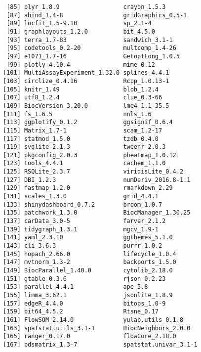 \documentclass[
  letterpaper,
  DIV=11,
  numbers=noendperiod]{scrreprt}
\begin{document}
\begin{verbatim}
 [85] plyr_1.8.9                  crayon_1.5.3               
 [87] abind_1.4-8                 gridGraphics_0.5-1         
 [89] locfit_1.5-9.10             sp_2.1-4                   
 [91] graphlayouts_1.2.0          bit_4.5.0                  
 [93] terra_1.7-83                sandwich_3.1-1             
 [95] codetools_0.2-20            multcomp_1.4-26            
 [97] e1071_1.7-16                GetoptLong_1.0.5           
 [99] plotly_4.10.4               mime_0.12                  
[101] MultiAssayExperiment_1.32.0 splines_4.4.1              
[103] circlize_0.4.16             Rcpp_1.0.13-1              
[105] knitr_1.49                  blob_1.2.4                 
[107] utf8_1.2.4                  clue_0.3-66                
[109] BiocVersion_3.20.0          lme4_1.1-35.5              
[111] fs_1.6.5                    nnls_1.6                   
[113] ggplotify_0.1.2             ggsignif_0.6.4             
[115] Matrix_1.7-1                scam_1.2-17                
[117] statmod_1.5.0               tzdb_0.4.0                 
[119] svglite_2.1.3               tweenr_2.0.3               
[121] pkgconfig_2.0.3             pheatmap_1.0.12            
[123] tools_4.4.1                 cachem_1.1.0               
[125] RSQLite_2.3.7               viridisLite_0.4.2          
[127] DBI_1.2.3                   numDeriv_2016.8-1.1        
[129] fastmap_1.2.0               rmarkdown_2.29             
[131] scales_1.3.0                grid_4.4.1                 
[133] shinydashboard_0.7.2        broom_1.0.7                
[135] patchwork_1.3.0             BiocManager_1.30.25        
[137] carData_3.0-5               farver_2.1.2               
[139] tidygraph_1.3.1             mgcv_1.9-1                 
[141] yaml_2.3.10                 ggthemes_5.1.0             
[143] cli_3.6.3                   purrr_1.0.2                
[145] hopach_2.66.0               lifecycle_1.0.4            
[147] mvtnorm_1.3-2               backports_1.5.0            
[149] BiocParallel_1.40.0         cytolib_2.18.0             
[151] gtable_0.3.6                rjson_0.2.23               
[153] parallel_4.4.1              ape_5.8                    
[155] limma_3.62.1                jsonlite_1.8.9             
[157] edgeR_4.4.0                 bitops_1.0-9               
[159] bit64_4.5.2                 Rtsne_0.17                 
[161] FlowSOM_2.14.0              yulab.utils_0.1.8          
[163] spatstat.utils_3.1-1        BiocNeighbors_2.0.0        
[165] ranger_0.17.0               flowCore_2.18.0            
[167] bdsmatrix_1.3-7             spatstat.univar_3.1-1      

\end{verbatim}
\end{document}
